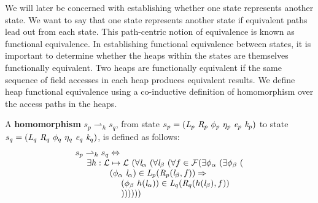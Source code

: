 We will later be concerned with establishing whether one state
represents another state. We want to say that one state represents
another state if equivalent paths lead out from each state. This
path-centric notion of equivalence is known as functional
equivalence. In establishing functional equivalence between states, it
is important to determine whether the heaps within the states are
themselves functionally equivalent. Two heaps are functionally
equivalent if the same sequence of field accesses in each heap
produces equivalent results. We define heap functional equivalence
using a co-inductive definition of homomorphism over the access paths
in the heaps.

\begin{definition}
\label{def:homomorphism}
A \textbf{homomorphism} $s_p \rightharpoonup_{h} s_q$, from state $s_p = ( \cfgnt{L}_p\ \cfgnt{R}_p\ \phi_p\ \eta_p\ \cfgnt{e}_p\ \cfgnt{k}_p )$ to state $s_q = ( \cfgnt{L}_q\ \cfgnt{R}_q\ \phi_q\ \eta_q\ \cfgnt{e}_q\ \cfgnt{k}_q )$, is defined as follows: 
$$
\begin{array}{l}
 s_p \rightharpoonup_{h} s_q \Leftrightarrow \\
\ \ \ \ \exists h: \mathcal{L} \mapsto \mathcal{L}\ (\forall \emph{l}_\alpha\ (\forall \emph{l}_\beta\ (\forall f \in \mathcal{F}( \exists \phi_\alpha\ (\exists \phi_\beta\ ( \\ 
\ \ \ \ \ \ \ \ \ \ \ \ (\phi_\alpha\ \emph{l}_\alpha) \in \emph{L}_p(\emph{R}_p (\emph{l}_\beta,f )) \Rightarrow \\
\ \ \ \ \ \ \ \ \ \ \ \ \ \ \ \  (\phi_\beta\ h(\emph{l}_\alpha))\in \emph{L}_q(\emph{R}_q (h(\emph{l}_\beta),f ))\ \\
\ \ \ \ \ \ \ \ \ \ \ \ \ \ \ \  )) ) ) ) )
\end{array}
$$
\begin{comment}
$$
\begin{array}{l}
s_p \rightharpoonup_{h} s_q \Leftrightarrow \\
\ \ \ \ \exists h: \mathcal{L} \mapsto \mathcal{L}\ (\forall \cfgnt{l}_\beta\ (\forall f \in \mathit{fields}(\mathrm{type}(\cfgnt{l}_\beta))\ ( \\
\ \ \ \ \ \ \ \ \ \ \ \ \forall (\phi_\alpha\ \cfgnt{l}_\alpha) \in \cfgnt{L}_p(\cfgnt{R}_p (\cfgnt{l}_\beta,f ))\ ( \\
\ \ \ \ \ \ \ \ \ \ \ \ \ \ \ \ \exists \phi_\beta\ ((\phi_\beta\ h(\cfgnt{l}_\alpha))\in \cfgnt{L}_q(\cfgnt{R}_q (h(\cfgnt{l}_\beta),f )))))))\\
\end{array}
$$
\end{comment}
\end{definition}

